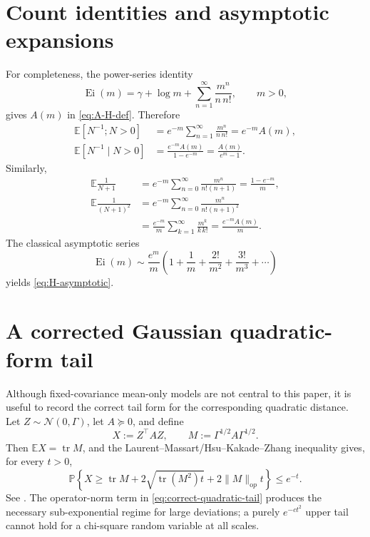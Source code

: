 \documentclass[11pt,a4paper]{article}
\theoremstyle{remark}
\newcommand{\EE}{\mathbb E}
\newcommand{\PP}{\mathbb P}
\newcommand{\tr}{\operatorname{tr}}
\begin{document}
\appendix

\section{Count identities and asymptotic expansions}
\label{app:count-identities}

For completeness, the power-series identity
\[
 \operatorname{Ei}(m)=\gamma+\log m+\sum_{n=1}^{\infty}\frac{m^n}{n\,n!},
 \qquad m>0,
\]
gives \(A(m)\) in \eqref{eq:A-H-def}.  Therefore
\begin{align*}
 \EE[N^{-1};N>0]
 &=e^{-m}\sum_{n=1}^{\infty}\frac{m^n}{n\,n!}
 =e^{-m}A(m),\\
 \EE[N^{-1}\mid N>0]
 &=\frac{e^{-m}A(m)}{1-e^{-m}}
 =\frac{A(m)}{e^m-1}.
\end{align*}
Similarly,
\begin{align*}
 \EE\frac1{N+1}
 &=e^{-m}\sum_{n=0}^{\infty}\frac{m^n}{n!(n+1)}
 =\frac{1-e^{-m}}{m},\\
 \EE\frac1{(N+1)^2}
 &=e^{-m}\sum_{n=0}^{\infty}\frac{m^n}{n!(n+1)^2}\\
 &=\frac{e^{-m}}{m}\sum_{k=1}^{\infty}\frac{m^k}{k\,k!}
 =\frac{e^{-m}A(m)}{m}.
\end{align*}
The classical asymptotic series
\[
 \operatorname{Ei}(m)
 \sim\frac{e^m}{m}\left(1+\frac1m+\frac{2!}{m^2}+\frac{3!}{m^3}+\cdots\right)
\]
yields \eqref{eq:H-asymptotic}.

\section{A corrected Gaussian quadratic-form tail}
\label{app:quadratic-tail}

Although fixed-covariance mean-only models are not central to this paper, it is useful to record the correct tail form for the corresponding quadratic distance.  Let \(Z\sim\mathcal N(0,\Gamma)\), let \(A\succeq0\), and define
\[
 X:=Z^\top A Z,
 \qquad
 M:=\Gamma^{1/2}A\Gamma^{1/2}.
\]
Then \(\EE X=\tr M\), and the Laurent--Massart/Hsu--Kakade--Zhang inequality gives, for every \(t>0\),
\begin{equation}
\label{eq:correct-quadratic-tail}
 \PP\!\left\{
 X\ge\tr M+2\sqrt{\tr(M^2)t}+2\|M\|_{\mathrm op}t
 \right\}\le e^{-t}.
\end{equation}
See \cite{laurent2000,hsu2012}.  The operator-norm term in \eqref{eq:correct-quadratic-tail} produces the necessary sub-exponential regime for large deviations; a purely \(e^{-ct^2}\) upper tail cannot hold for a chi-square random variable at all scales.
\end{document}
